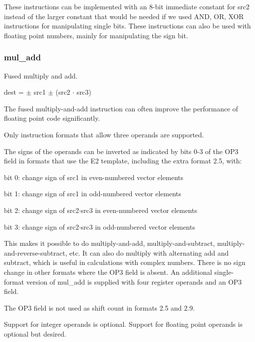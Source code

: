 \documentclass[forwardcom.tex]{subfiles}
\begin{document}
These instructions can be implemented with an 8-bit immediate constant for src2 instead of the larger constant that would be needed if we used AND, OR, XOR instructions for manipulating single bits. These instructions can also be used with floating point numbers, mainly for manipulating the sign bit.

\subsubsection{mul\_add}
Fused multiply and add.
\vspace{2mm}

dest = $\pm$ src1 $\pm$ (src2 $\cdot$ src3)
\vspace{2mm}

The fused multiply-and-add instruction can often improve the performance of floating point code significantly.
\vspace{2mm}

Only instruction formats that allow three operands are supported.
\vspace{2mm}

The signs of the operands can be inverted as indicated by bits 0-3 of the OP3 field in formats that use the E2 template, including the extra format 2.5, with:
\vspace{2mm}

bit 0: change sign of src1 in even-numbered vector elements

bit 1: change sign of src1 in odd-numbered vector elements

bit 2: change sign of src2$\cdot$src3 in even-numbered vector elements

bit 3: change sign of src2$\cdot$src3 in odd-numbered vector elements
\vspace{2mm}

This makes it possible to do multiply-and-add, multiply-and-subtract, multiply-and-reverse-subtract, etc. It can also do multiply with alternating add and subtract, which is useful in calculations with complex numbers. There is no sign change in other formats where the OP3 field is absent. An additional single-format version of mul\_add is supplied with four register operands and an OP3 field.
\vspace{2mm}

The OP3 field is not used as shift count in formats 2.5 and 2.9.
\vspace{2mm}

Support for integer operands is optional. Support for floating point operands is optional but desired.
\end{document}
